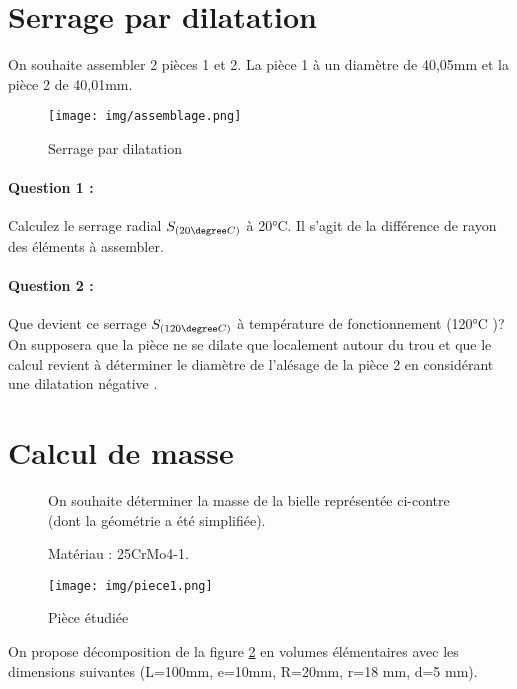 

\section{Serrage par dilatation}

On souhaite assembler 2 pièces 1 et 2. La pièce 1 à un diamètre de 40,05mm et la pièce 2 de 40,01mm. 

\begin{figure}[!h]
  \centering\texttt{[image: img/assemblage.png]}
  \caption{Serrage par dilatation}
  \label{img:image1}
\end{figure}

\paragraph{Question 1 :} Calculez le serrage radial $S_{(20\degree C)}$ à 20°C. Il s'agit de la différence de rayon des éléments à assembler.

\paragraph{Question 2 :} Que devient ce serrage $S_{(120\degree C)}$ à température de fonctionnement (120°C )? On supposera que la pièce ne se dilate que localement autour du trou et que le calcul revient à déterminer le diamètre de l'alésage de la pièce 2 en considérant une \og dilatation négative \fg.
 
\section{Calcul de masse}

\begin{figure}[!h]
 \begin{minipage}{0.6\linewidth}
On souhaite déterminer la masse de la bielle représentée ci-contre (dont la géométrie a été simplifiée). 
 
Matériau : 25CrMo4-1. 
 \end{minipage}
\hfill
 \begin{minipage}{0.35\linewidth}
  \centering\texttt{[image: img/piece1.png]}
  \caption{Pièce étudiée}
  \label{img:image2}
 \end{minipage}
\end{figure}
 
On propose décomposition de la figure \ref{img:image2} en volumes élémentaires avec les dimensions suivantes (L=100mm, e=10mm, R=20mm, r=18 mm, d=5 mm).

